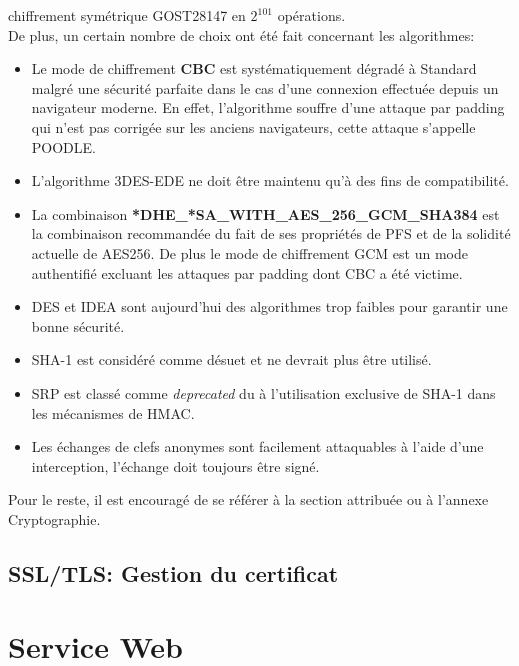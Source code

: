 \documentclass[twoside,a4paper,12pt,titlepage]{book}
\begin{document}
chiffrement symétrique GOST28147 en $2^{101}$ opérations.\\
De plus, un certain nombre de choix ont été fait concernant les algorithmes:\begin{itemize}
\item Le mode de chiffrement \textbf{CBC} est systématiquement dégradé à Standard malgré une sécurité parfaite dans le cas d'une connexion effectuée depuis un navigateur moderne. En effet, l'algorithme souffre d'une attaque par padding qui n'est pas corrigée sur les anciens navigateurs, cette attaque s'appelle POODLE.
\item L'algorithme 3DES-EDE ne doit être maintenu qu'à des fins de compatibilité.
\item La combinaison \textbf{*DHE\_*SA\_WITH\_AES\_256\_GCM\_SHA384} est la combinaison recommandée du fait de ses propriétés de PFS et de la solidité actuelle de AES256. De plus le mode de chiffrement GCM est un mode authentifié excluant les attaques par padding dont CBC a été victime.
\item DES et IDEA sont aujourd'hui des algorithmes trop faibles pour garantir une bonne sécurité.
\item SHA-1 est considéré comme désuet et ne devrait plus être utilisé.
\item SRP est classé comme \textit{deprecated} du à l'utilisation exclusive de SHA-1 dans les mécanismes de HMAC.
\item Les échanges de clefs anonymes sont facilement attaquables à l'aide d'une interception, l'échange doit toujours être signé.
\end{itemize}
Pour le reste, il est encouragé de se référer à la section attribuée ou à l'annexe Cryptographie.


\subsection{SSL/TLS: Gestion du certificat}

\section{Service Web}
\end{document}
